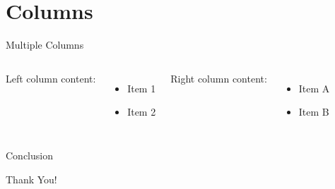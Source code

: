 \documentclass{beamer}
\begin{document}
\section{Columns}

\begin{frame}{Multiple Columns}
\begin{columns}
Left column content:
\begin{itemize}
  \item Item 1
  \item Item 2
\end{itemize}

Right column content:
\begin{itemize}
  \item Item A
  \item Item B
\end{itemize}
\end{columns}
\end{frame}

\begin{frame}{Conclusion}
\begin{center}
\Huge{Thank You!}
\end{center}
\end{frame}
\end{document}
